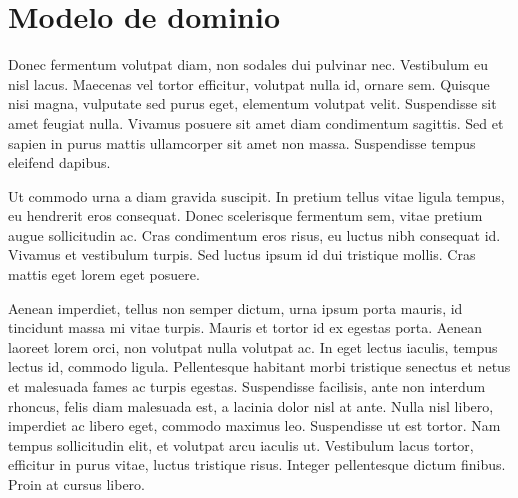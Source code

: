 \documentclass[../informe.tex]{subfiles}
\begin{document}
\section{Modelo de dominio}\label{sec:modelo}

Donec fermentum volutpat diam, non sodales dui pulvinar nec. Vestibulum eu nisl lacus. Maecenas vel tortor efficitur, volutpat nulla id, ornare sem. Quisque nisi magna, vulputate sed purus eget, elementum volutpat velit. Suspendisse sit amet feugiat nulla. Vivamus posuere sit amet diam condimentum sagittis. Sed et sapien in purus mattis ullamcorper sit amet non massa. Suspendisse tempus eleifend dapibus.

Ut commodo urna a diam gravida suscipit. In pretium tellus vitae ligula tempus, eu hendrerit eros consequat. Donec scelerisque fermentum sem, vitae pretium augue sollicitudin ac. Cras condimentum eros risus, eu luctus nibh consequat id. Vivamus et vestibulum turpis. Sed luctus ipsum id dui tristique mollis. Cras mattis eget lorem eget posuere.

Aenean imperdiet, tellus non semper dictum, urna ipsum porta mauris, id tincidunt massa mi vitae turpis. Mauris et tortor id ex egestas porta. Aenean laoreet lorem orci, non volutpat nulla volutpat ac. In eget lectus iaculis, tempus lectus id, commodo ligula. Pellentesque habitant morbi tristique senectus et netus et malesuada fames ac turpis egestas. Suspendisse facilisis, ante non interdum rhoncus, felis diam malesuada est, a lacinia dolor nisl at ante. Nulla nisl libero, imperdiet ac libero eget, commodo maximus leo. Suspendisse ut est tortor. Nam tempus sollicitudin elit, et volutpat arcu iaculis ut. Vestibulum lacus tortor, efficitur in purus vitae, luctus tristique risus. Integer pellentesque dictum finibus. Proin at cursus libero.


\end{document}
